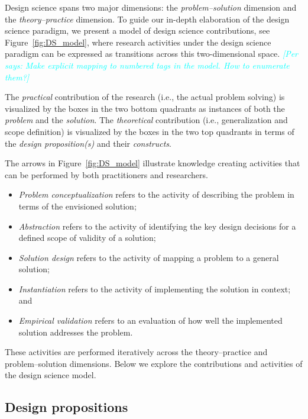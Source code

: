 \documentclass[graybox]{svmult}
\newcommand{\per}[1]{\textcolor{cyan}{{\it [Per says: #1]}}}
\newcommand{\per}[1]{}
\begin{document}
Design science spans two major dimensions: the \emph{problem--solution} dimension and the \emph{theory--practice} dimension. To guide our in-depth elaboration of the design science paradigm, we present a model of design science contributions, see Figure~\ref{fig:DS_model}, where research activities under the design science paradigm can be expressed as transitions across this two-dimensional space.
\per{Make explicit mapping to numbered tags in the model. How to enumerate them?}

The \emph{practical} contribution of the research (i.e., the actual problem solving) is visualized by the boxes in the two bottom quadrants as instances of both the \emph{problem} and the \emph{solution}. The \emph{theoretical} contribution (i.e., generalization and scope definition) is visualized by the boxes in the two top quadrants in terms of the \emph{design proposition(s)} and their \emph{constructs}. 

The arrows in Figure~\ref{fig:DS_model} illustrate knowledge creating activities that can be performed by both practitioners and researchers. 
\begin{itemize}
\item \emph{Problem conceptualization} refers to the activity of describing the problem in terms of the envisioned solution; 
\item \emph{Abstraction} refers to the activity of identifying the key design decisions for a defined scope of validity of a solution; 
\item \emph{Solution design} refers to the activity of mapping a problem to a general solution; 
\item \emph{Instantiation} refers to the activity of implementing the solution in context; and 
\item \emph{Empirical validation} refers to an evaluation of how well the implemented solution addresses the problem.
\end{itemize}

These activities are performed iteratively across the theory--practice and problem--solution dimensions. Below we explore the contributions and activities of the design science model. 

\subsection{Design propositions}
\label{sec:technologicalrules}
\end{document}
